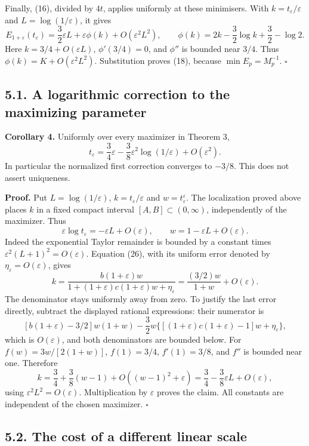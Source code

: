 \documentclass[11pt,a4paper]{article}
\begin{document}
Finally, (16), divided by \(4t\), applies uniformly at these minimisers. With \(k=t_\varepsilon/\varepsilon\) and \(L=\log(1/\varepsilon)\), it gives \[
E_{1+\varepsilon}(t_\varepsilon)
=\frac32\varepsilon L+\varepsilon\phi(k)+O(\varepsilon^2L^2),
\qquad
\phi(k)=2k-\frac32\log k+\frac32-\log2.
\] Here \(k=3/4+O(\varepsilon L)\), \(\phi'(3/4)=0\), and \(\phi''\) is bounded near \(3/4\). Thus \(\phi(k)=K+O(\varepsilon^2L^2)\). Substitution proves (18), because \(\min E_p=M_p^{-1}\). \(\square\)

\subsection*{5.1. A logarithmic correction to the maximizing parameter}\label{a-logarithmic-correction-to-the-maximizing-parameter}

\textbf{Corollary 4.} Uniformly over every maximizer in Theorem 3, \[
t_\varepsilon=\frac34\varepsilon-\frac38\varepsilon^2\log(1/\varepsilon)
+O(\varepsilon^2).
\] In particular the normalized first correction converges to \(-3/8\). This does not assert uniqueness.

\textbf{Proof.} Put \(L=\log(1/\varepsilon)\), \(k=t_\varepsilon/\varepsilon\) and \(w=t_\varepsilon^\varepsilon\). The localization proved above places \(k\) in a fixed compact interval \([A,B]\subset(0,\infty)\), independently of the maximizer. Thus \[
\varepsilon\log t_\varepsilon=-\varepsilon L+O(\varepsilon),\qquad
w=1-\varepsilon L+O(\varepsilon).
\] Indeed the exponential Taylor remainder is bounded by a constant times \(\varepsilon^2(L+1)^2=O(\varepsilon)\). Equation (26), with its uniform error denoted by \(\eta_\varepsilon=O(\varepsilon)\), gives \[
k=\frac{b(1+\varepsilon)w}
 {1+(1+\varepsilon)c(1+\varepsilon)w+\eta_\varepsilon}
 =\frac{(3/2)w}{1+w}+O(\varepsilon).
\] The denominator stays uniformly away from zero. To justify the last error directly, subtract the displayed rational expressions: their numerator is \[
[b(1+\varepsilon)-3/2]w(1+w)
-\frac32w\{[(1+\varepsilon)c(1+\varepsilon)-1]w+\eta_\varepsilon\},
\] which is \(O(\varepsilon)\), and both denominators are bounded below. For \(f(w)=3w/[2(1+w)]\), \(f(1)=3/4\), \(f'(1)=3/8\), and \(f''\) is bounded near one. Therefore \[
k=\frac34+\frac38(w-1)+O((w-1)^2+\varepsilon)
=\frac34-\frac38\varepsilon L+O(\varepsilon),
\] using \(\varepsilon^2L^2=O(\varepsilon)\). Multiplication by \(\varepsilon\) proves the claim. All constants are independent of the chosen maximizer. \(\square\)

\subsection*{5.2. The cost of a different linear scale}\label{the-cost-of-a-different-linear-scale}
\end{document}
